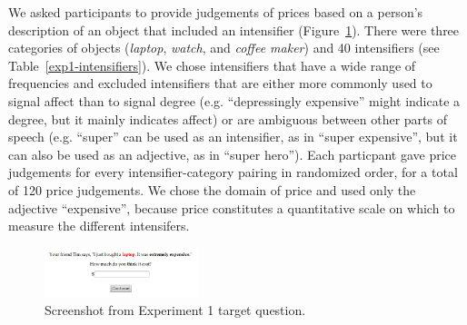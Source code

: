 \documentclass[10pt,letterpaper]{article}
\begin{document}
We asked participants to provide judgements of prices based on a person's description of an object that included an intensifier (Figure~\ref{exp1-q}).
There were three categories of objects (\emph{laptop}, \emph{watch}, and \emph{coffee maker}) and 40 intensifiers (see Table~\ref{exp1-intensifiers}).
We chose intensifiers that have a wide range of frequencies and excluded intensifiers that are either more commonly used to signal affect than to signal degree (e.g. ``depressingly expensive'' might indicate a degree, but it mainly indicates affect) or are ambiguous between other parts of speech (e.g. ``super'' can be used as an intensifier, as in ``super expensive'', but it can also be used as an adjective, as in ``super hero'').
Each particpant gave price judgements for every intensifier-category pairing in randomized order, for a total of 120 price judgements.
We chose the domain of price and used only the adjective ``expensive'', because price constitutes a quantitative scale on which to measure the different intensifers.%

\begin{figure}[ht]
\begin{center}
\includegraphics[width=0.4\textwidth]{analysis_files_for_writeup/images/exp1-q.png}
\end{center}
\caption{Screenshot from Experiment 1 target question.} 
\label{exp1-q}
\end{figure}
\end{document}
